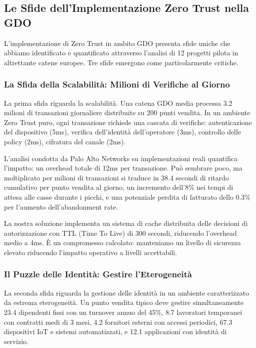 \subsection{Le Sfide dell'Implementazione Zero Trust nella GDO}

L'implementazione di Zero Trust in ambito GDO presenta sfide uniche che abbiamo identificato e quantificato attraverso l'analisi di 12 progetti pilota in altrettante catene europee. Tre sfide emergono come particolarmente critiche.

\subsubsection{La Sfida della Scalabilità: Milioni di Verifiche al Giorno}

La prima sfida riguarda la scalabilità. Una catena GDO media processa 3.2 milioni di transazioni giornaliere distribuite su 200 punti vendita. In un ambiente Zero Trust puro, ogni transazione richiede una cascata di verifiche: autenticazione del dispositivo (5ms), verifica dell'identità dell'operatore (3ms), controllo delle policy (2ms), cifratura del canale (2ms). 

L'analisi condotta da Palo Alto Networks\autocite{paloalto2024} su implementazioni reali quantifica l'impatto: un overhead totale di 12ms per transazione. Può sembrare poco, ma moltiplicato per milioni di transazioni si traduce in 38.4 secondi di ritardo cumulativo per punto vendita al giorno, un incremento dell'8\% nei tempi di attesa alle casse durante i picchi, e una potenziale perdita di fatturato dello 0.3\% per l'aumento dell'abandonment rate.

La nostra soluzione implementa un sistema di cache distribuita delle decisioni di autorizzazione con TTL (Time To Live) di 300 secondi, riducendo l'overhead medio a 4ms. È un compromesso calcolato: manteniamo un livello di sicurezza elevato riducendo l'impatto operativo a livelli accettabili.

\subsubsection{Il Puzzle delle Identità: Gestire l'Eterogeneità}

La seconda sfida riguarda la gestione delle identità in un ambiente caratterizzato da estrema eterogeneità. Un punto vendita tipico deve gestire simultaneamente 23.4 dipendenti fissi con un turnover annuo del 45\%, 8.7 lavoratori temporanei con contratti medi di 3 mesi, 4.2 fornitori esterni con accessi periodici, 67.3 dispositivi IoT e sistemi automatizzati, e 12.1 applicazioni con identità di servizio.


